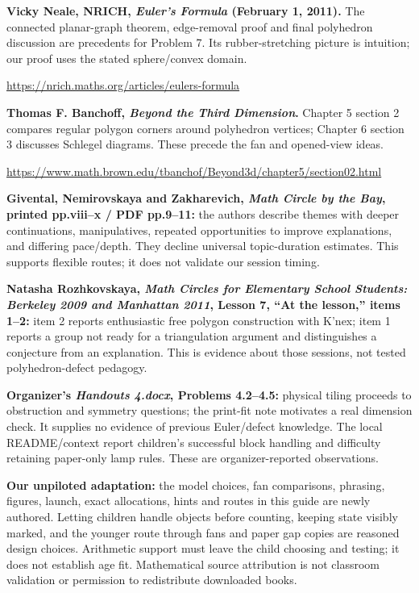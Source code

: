 \documentclass[11pt,letterpaper]{article}
\newcommand{\sub}[1]{\par\vspace{3pt}{\bfseries #1}\par}
\begin{document}
\textbf{Vicky Neale, NRICH, \emph{Euler's Formula} (February 1, 2011).} The connected planar-graph theorem, edge-removal proof and final polyhedron discussion are precedents for Problem 7. Its rubber-stretching picture is intuition; our proof uses the stated sphere/convex domain.\par
\url{https://nrich.maths.org/articles/eulers-formula}

\textbf{Thomas F. Banchoff, \emph{Beyond the Third Dimension}.} Chapter 5 section 2 compares regular polygon corners around polyhedron vertices; Chapter 6 section 3 discusses Schlegel diagrams. These precede the fan and opened-view ideas.\par
\url{https://www.math.brown.edu/tbanchof/Beyond3d/chapter5/section02.html}

\sub{Teaching evidence, and our adaptation}
\textbf{Givental, Nemirovskaya and Zakharevich, \emph{Math Circle by the Bay}, printed pp.viii--x / PDF pp.9--11:} the authors describe themes with deeper continuations, manipulatives, repeated opportunities to improve explanations, and differing pace/depth. They decline universal topic-duration estimates. This supports flexible routes; it does not validate our session timing.

\textbf{Natasha Rozhkovskaya, \emph{Math Circles for Elementary School Students: Berkeley 2009 and Manhattan 2011}, Lesson 7, ``At the lesson,'' items 1--2:} item 2 reports enthusiastic free polygon construction with K'nex; item 1 reports a group not ready for a triangulation argument and distinguishes a conjecture from an explanation. This is evidence about those sessions, not tested polyhedron-defect pedagogy.

\textbf{Organizer's \emph{Handouts 4.docx}, Problems 4.2--4.5:} physical tiling proceeds to obstruction and symmetry questions; the print-fit note motivates a real dimension check. It supplies no evidence of previous Euler/defect knowledge. The local README/context report children's successful block handling and difficulty retaining paper-only lamp rules. These are organizer-reported observations.

\textbf{Our unpiloted adaptation:} the model choices, fan comparisons, phrasing, figures, launch, exact allocations, hints and routes in this guide are newly authored. Letting children handle objects before counting, keeping state visibly marked, and the younger route through fans and paper gap copies are reasoned design choices. Arithmetic support must leave the child choosing and testing; it does not establish age fit. Mathematical source attribution is not classroom validation or permission to redistribute downloaded books.
\end{document}
